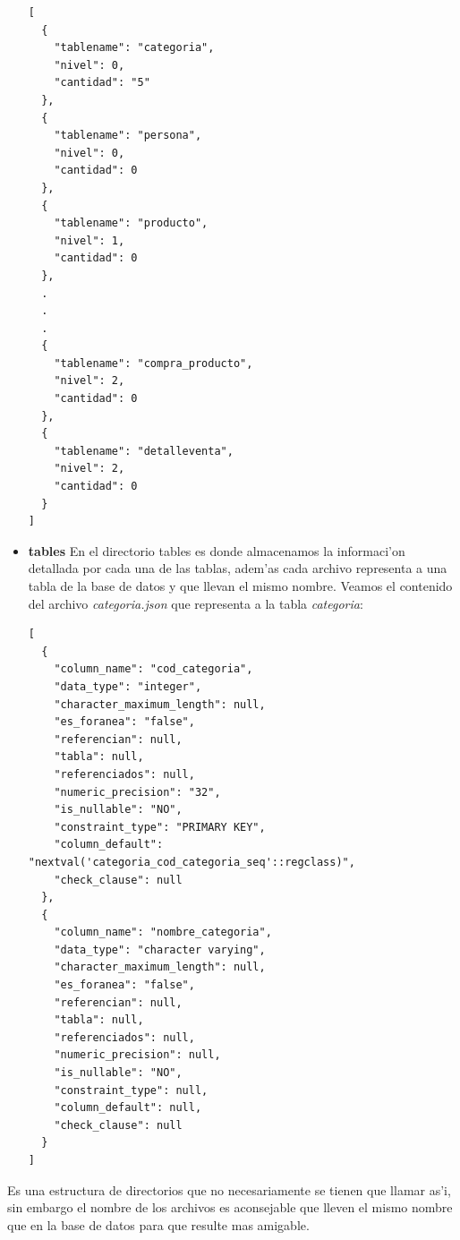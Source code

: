 \begin{itemize}
\begin{lstlisting}
[
  {
    "tablename": "categoria",
    "nivel": 0,
    "cantidad": "5"
  },
  {
    "tablename": "persona",
    "nivel": 0,
    "cantidad": 0
  },
  {
    "tablename": "producto",
    "nivel": 1,
    "cantidad": 0
  },
  .
  .
  .
  {
    "tablename": "compra_producto",
    "nivel": 2,
    "cantidad": 0
  },
  {
    "tablename": "detalleventa",
    "nivel": 2,
    "cantidad": 0
  }
]
\end{lstlisting}  
\item \textbf{tables} En el directorio tables es donde almacenamos la informaci'on detallada por cada una de las tablas, adem'as cada archivo representa a una tabla de la base de datos y que llevan el mismo nombre. Veamos el contenido del archivo \textit{categoria.json} que representa a la tabla \textit{categoria}:
\lstset{language=java,breaklines=true}
\label{tablaCompraProductoArchivoControl}
\begin{lstlisting}
[
  {
    "column_name": "cod_categoria",
    "data_type": "integer",
    "character_maximum_length": null,
    "es_foranea": "false",
    "referencian": null,
    "tabla": null,
    "referenciados": null,
    "numeric_precision": "32",
    "is_nullable": "NO",
    "constraint_type": "PRIMARY KEY",
    "column_default": "nextval('categoria_cod_categoria_seq'::regclass)",
    "check_clause": null
  },
  {
    "column_name": "nombre_categoria",
    "data_type": "character varying",
    "character_maximum_length": null,
    "es_foranea": "false",
    "referencian": null,
    "tabla": null,
    "referenciados": null,
    "numeric_precision": null,
    "is_nullable": "NO",
    "constraint_type": null,
    "column_default": null,
    "check_clause": null
  }
]
\end{lstlisting} 
\end{itemize}

Es una estructura de directorios que no necesariamente se tienen que llamar as'i, sin embargo el nombre de los archivos es aconsejable que lleven el mismo nombre que en la base de datos para que resulte mas amigable.
